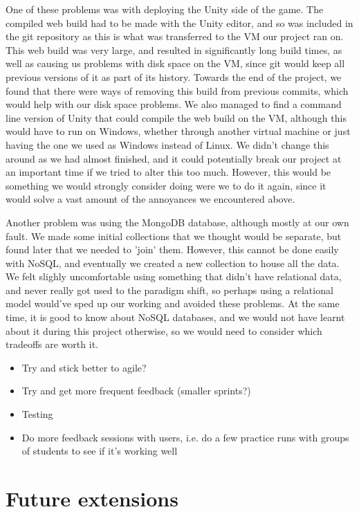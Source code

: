 One of these problems was with deploying the Unity side of the game. The
compiled web build had to be made with the Unity editor, and so was included in
the git repository as this is what was transferred to the VM our project ran on.
This web build was very large, and resulted in significantly long build times,
as well as causing us problems with disk space on the VM, since git would keep
all previous versions of it as part of its history. Towards the end of the
project, we found that there were ways of removing this build from previous
commits, which would help with our disk space problems. We also managed to find
a command line version of Unity that could compile the web build on the VM,
although this would have to run on Windows, whether through another virtual
machine or just having the one we used as Windows instead of Linux. We didn't
change this around as we had almost finished, and it could potentially break our
project at an important time if we tried to alter this too much. However, this
would be something we would strongly consider doing were we to do it again,
since it would solve a vast amount of the annoyances we encountered above.

Another problem was using the MongoDB database, although mostly at our own
fault. We made some initial collections that we thought would be separate, but
found later that we needed to 'join' them. However, this cannot be done easily
with NoSQL, and eventually we created a new collection to house all the data. We
felt slighly uncomfortable using something that didn't have relational data, and
never really got used to the paradigm shift, so perhaps using a relational model
would've sped up our working and avoided these problems. At the same time, it is
good to know about NoSQL databases, and we would not have learnt about it during
this project otherwise, so we would need to consider which tradeoffs are worth
it.
 
\begin{itemize}
    \item
        Try and stick better to agile?
    \item
        Try and get more frequent feedback (smaller sprints?)
    \item
        Testing
    \item
        Do more feedback sessions with users, i.e. do a few practice runs with
        groups of students to see if it's working well
\end{itemize}

\section{Future extensions}


